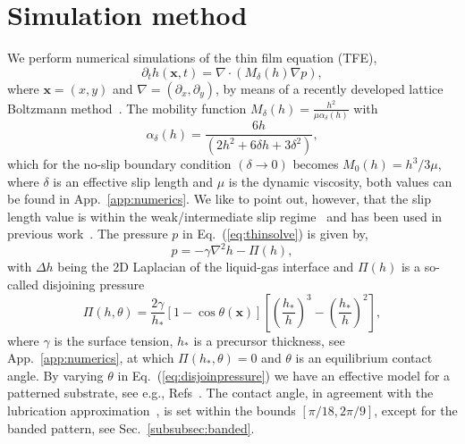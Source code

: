 \documentclass[twoside,twocolumn,9pt]{article}
\begin{document}
\section{Simulation method}
\label{sec:method}
We perform numerical simulations of the thin film equation (TFE),  
\begin{equation}\label{eq:thinsolve}
     \partial_t h(\mathbf{x},t) = \nabla\cdot\left(M_{\delta}(h)\nabla p\right),
\end{equation}
where $\mathbf{x} = (x,y)$ and $\nabla = (\partial_x, \partial_y)$, by means of a recently developed lattice Boltzmann method~\cite{zitzLatticeBoltzmannMethod2019, zitzLatticeBoltzmannSimulations2021, zitzSwalbeJlLattice2022, zitzControllingDewettingMorphologies2023}. 
The mobility function $M_{\delta}(h) = \frac{h^2}{\mu\alpha_{\delta}(h)}$ with 
\begin{equation}\label{eq:alphafric}
    \alpha_{\delta}(h) = \frac{6h}{(2 h^2 + 6 \delta h + 3 \delta^2)},
\end{equation}
which for the no-slip boundary condition $(\delta \rightarrow 0)$ becomes $M_{0}(h) = h^3/3\mu$, where $\delta$ is an effective slip length and $\mu$ is the dynamic viscosity, both values can be found in App.~\ref{app:numerics}.
We like to point out, however, that the slip length value is within the weak/intermediate slip regime~\cite{peschkaSignaturesSlipDewetting2019,fetzerQuantifyingHydrodynamicSlip2007, munchLubricationModelsSmall2005} and has been used in previous work~\cite{zitzControllingDewettingMorphologies2023}.
The pressure $p$ in Eq.~(\ref{eq:thinsolve}) is given by,
\begin{equation}\label{eq:filmpressure}
    p = - \gamma\nabla^2 h -\Pi(h),
\end{equation}
with $\Delta h$ being the 2D Laplacian of the liquid-gas interface and $\Pi(h)$ is a so-called disjoining pressure~\cite{schwartzSimulationDropletMotion1998, crasterDynamicsStabilityThin2009, nguyenCompetitionCollapseBreakup2012, gonzalezStabilityLiquidRing2013}
\begin{equation}\label{eq:disjoinpressure}
    \Pi(h,\theta) = \frac{2\gamma}{h_{\ast}}[1-\cos\theta(\mathbf{x})]\left[\left(\frac{h_*}{h}\right)^3 -\left(\frac{h_*}{h}\right)^2\right],
\end{equation}
where $\gamma$ is the surface tension, $h_{\ast}$ is a precursor thickness, see App.~\ref{app:numerics}, at which $\Pi(h_{\ast}, \theta) = 0$ and $\theta$ is an equilibrium contact angle.
By varying $\theta$ in Eq.~(\ref{eq:disjoinpressure}) we have an effective model for a patterned substrate, see e.g., Refs~\cite{zitzLatticeBoltzmannSimulations2021, zitzControllingDewettingMorphologies2023}. 
The contact angle, in agreement with the lubrication approximation~\cite{oronLongscaleEvolutionThin1997, crasterDynamicsStabilityThin2009}, is set within the bounds $[\pi/18, 2\pi/9]$, except for the banded pattern, see Sec.~\ref{subsubsec:banded}. 
\end{document}
